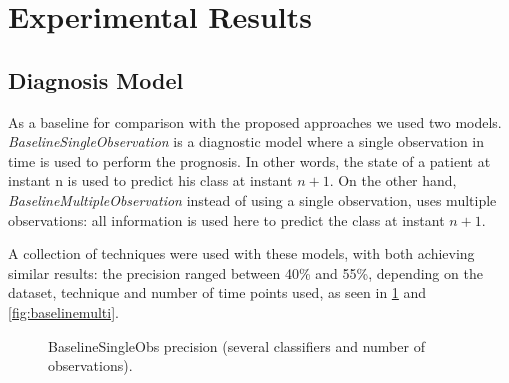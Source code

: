 \section{Experimental Results}
\label{section:results}


\subsection{Diagnosis Model}
\label{subsection:diagnosis}

As a baseline for comparison with the proposed approaches we used two models. \emph{BaselineSingleObservation} is a diagnostic model
 where a single observation in time is used to perform the prognosis. In other words, the state of a patient at instant n is
 used to predict his class at instant $n+1$. On the other hand, \emph{BaselineMultipleObservation} instead of using a single observation,
 uses multiple observations: all information is used here to predict the class at instant $n+1$.

A collection of techniques were used with these models, with both achieving similar results: the precision ranged between 40\% and 55\%,
 depending on the dataset, technique and number of time points used, as seen in \ref{fig:baselinesingle} and \ref{fig:baselinemulti}.
 
 \begin{figure}
  \begin{subfigmatrix}{2}
  \end{subfigmatrix}
  \caption{BaselineSingleObs precision (several classifiers and number of observations).}
  \label{fig:baselinesingle}
\end{figure}

